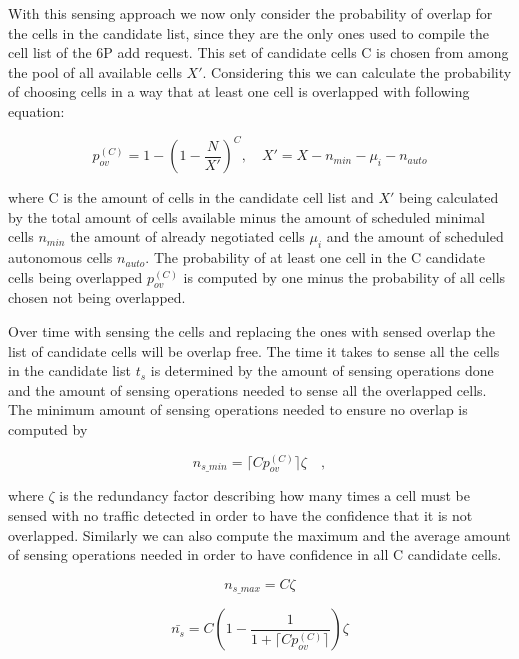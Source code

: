 \documentclass{comnets-thesis}
\begin{document}
With this sensing approach we now only consider the probability of overlap for the cells in the candidate list, since they are the only ones used to compile the cell list of the \ac{6P} add request. This set of candidate cells C is chosen from among the pool of all available cells $X'$. Considering this we can calculate the probability of choosing cells in a way that at least one cell is overlapped with following equation:

\begin{equation}
    p_{ov}^{(C)} = 1 - (1 - \frac{N}{X'})^C , \quad X'=X-n_{min}-\mu_i-n_{auto}
\end{equation}

where C is the amount of cells in the candidate cell list and $X'$ being calculated by the total amount of cells available minus the amount of scheduled minimal cells $n_{min}$ the amount of already negotiated cells $\mu_i$ and the amount of scheduled autonomous cells $n_{auto}$. The probability of at least one cell in the C candidate cells being overlapped $p_{ov}^{(C)}$ is computed by one minus the probability of all cells chosen not being overlapped.

Over time with sensing the cells and replacing the ones with sensed overlap the list of candidate cells will be overlap free. The time it takes to sense all the cells in the candidate list $t_s$ is determined by the amount of sensing operations done and the amount of sensing operations needed to sense all the overlapped cells. The minimum amount of sensing operations needed to ensure no overlap is computed by

\begin{equation}
    n_{s\_min} = \lceil Cp_{ov}^{(C)} \rceil \zeta \quad ,
\end{equation}

where $\zeta$ is the redundancy factor describing how many times a cell must be sensed with no traffic detected in order to have the confidence that it is not overlapped.
Similarly we can also compute the maximum and the average amount of sensing operations needed in order to have confidence in all C candidate cells.

\begin{equation}
    n_{s\_max} = C \zeta
\end{equation}

\begin{equation}
   \bar{n_s} = C(1-\frac{1}{1+\lceil Cp_{ov}^{(C)} \rceil}) \zeta
\end{equation}
\end{document}
